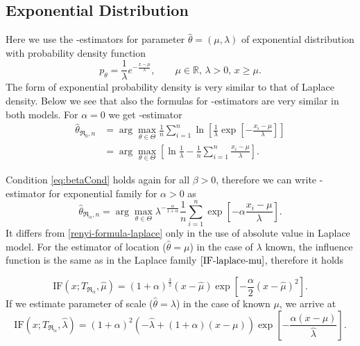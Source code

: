 \subsection{Exponential Distribution} 
Here we use the \mRa-estimators for parameter $\hat{\theta} = (\mu,\lambda)$ of exponential distribution with probability density function 
\begin{equation}
	p_\theta = \frac{1}{\lambda} e^{-\frac{x-\mu}{\lambda}}, \qquad \mu\in \mathbb{R},\, \lambda>0, \, x\geq\mu.
\end{equation}
\noindent The form of exponential probability density is very similar to that of Laplace density. Below we see that also the formulas for \mRa-estimators are very similar in both models. For $\alpha = 0$ we get \mRa-estimator
\begin{align}
	\hat{\theta}_{\mathfrak{R}_0,n} & =  \arg \max_{\theta \in \Theta} \frac{1}{n} \sum^n_{i=1} \ln \left[ \frac{1}{\lambda}\exp \left[-\frac{x_i-\mu}{\lambda} \right] \right] \nonumber \\
	& =  \arg \max_{\theta \in \Theta} \left[ \ln \frac{1}{\lambda} - \frac{1}{n} \sum^n_{i=1} \frac{x_i-\mu}{\lambda} \right].
\end{align}

\noindent Condition \eqref{eq:betaCond} holds again for all  $\beta>0$, therefore we can write \mRa-estimator for exponential family for $\alpha>0$ as
\begin{equation}
	\hat{\theta}_{\mathfrak{R}_\alpha,n} = \arg \max_{\theta \in \Theta} \lambda^{-\frac{\alpha}{1+\alpha}} \frac{1}{n}\sum_{i=1}^n \exp \left[-\alpha\frac{x_i-\mu}{\lambda} \right].
	\label{renyi-formula-exponential}
\end{equation}
It differs from \eqref{renyi-formula-laplace} only in the use of absolute value in Laplace model. For  the estimator of location ($\hat{\theta} = \mu$) in the case of $\lambda$ known, the influence function is the same as in the Laplace family $\eqref{IF-laplace-mu}$, therefore it holds

\begin{equation}
	\mathrm{IF}(x;T_{\mathfrak{R}_\alpha},\hat{\mu}) = (1+\alpha )^{\frac{3}{2}} (x-\hat{\mu} )  \exp\left[{-\frac{\alpha}{2} (x-\hat{\mu} )^2}\right]. %
	\label{IF-exponential-mu}
\end{equation}
If we estimate parameter of scale ($\hat{\theta} = \lambda$) in the case of known $ \mu $, we arrive at
\begin{equation}
	\mathrm{IF}(x;T_{\mathfrak{R}_\alpha},\hat{\lambda}) =	(1+\alpha )^2 \left( - \hat{\lambda} +(1+ \alpha)(x-\mu)\right) \exp \left[{-\frac{\alpha (x-\mu)}{\hat{\lambda} }}\right]. %
	\label{IF-exponential-lambda}
\end{equation}

